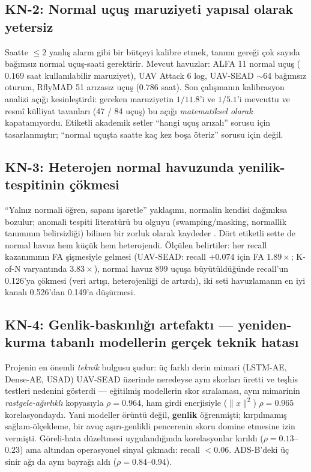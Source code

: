 \documentclass[11pt,a4paper]{article}
\begin{document}
\subsection{KN-2: Normal uçuş maruziyeti yapısal olarak yetersiz}

Saatte $\leq 2$ yanlış alarm gibi bir bütçeyi kalibre etmek, tanımı gereği çok
sayıda bağımsız normal uçuş-saati gerektirir. Mevcut havuzlar: ALFA 11 normal
uçuş ($0.169$ saat kullanılabilir maruziyet), UAV Attack 6 log, UAV-SEAD
$\sim$64 bağımsız oturum, RflyMAD 51 arızasız uçuş ($0.786$ saat). Son
çalışmanın kalibrasyon analizi açığı kesinleştirdi: gereken maruziyetin
$1/11.8$'i ve $1/5.1$'i mevcuttu ve resmî külliyat tavanları (47 / 84 uçuş) bu
açığı \emph{matematiksel olarak} kapatamıyordu. Etiketli akademik setler
``hangi uçuş arızalı'' sorusu için tasarlanmıştır; ``normal uçuşta saatte kaç
kez boşa öteriz'' sorusu için değil.

\subsection{KN-3: Heterojen normal havuzunda yenilik-tespitinin çökmesi}

``Yalnız normali öğren, sapanı işaretle'' yaklaşımı, normalin kendisi
dağınıksa bozulur; anomali tespiti literatürü bu olguyu (swamping/masking,
normallik tanımının belirsizliği) bilinen bir zorluk olarak kaydeder
\cite{ruff2021unifying}. Dört etiketli sette de normal havuz hem küçük hem
heterojendi. Ölçülen belirtiler: her recall kazanımının FA şişmesiyle gelmesi
(UAV-SEAD: recall $+0.074$ için FA $1.89\times$; K-of-N varyantında
$3.83\times$), normal havuz 899 uçuşa büyütüldüğünde recall'un 0.126'ya
çökmesi (veri artışı, heterojenliği de artırdı), iki seti havuzlamanın en iyi
kanalı 0.526'dan 0.149'a düşürmesi.

\subsection{KN-4: Genlik-baskınlığı artefaktı --- yeniden-kurma tabanlı
modellerin gerçek teknik hatası}
\label{sec:kn-artefakt}

Projenin en önemli \emph{teknik} bulgusu şudur: üç farklı derin mimari
(LSTM-AE, Dense-AE, USAD) UAV-SEAD üzerinde neredeyse aynı skorları üretti ve
teşhis testleri nedenini gösterdi --- eğitilmiş modellerin skor sıralaması,
aynı mimarinin \emph{rastgele-ağırlıklı} kopyasıyla $\rho = 0.964$, ham girdi
enerjisiyle ($\lVert x\rVert^2$) $\rho = 0.965$ korelasyondaydı. Yani modeller
örüntü değil, \textbf{genlik} öğrenmişti; kırpılmamış sağlam-ölçekleme, bir
avuç aşırı-genlikli pencerenin skoru domine etmesine izin vermişti. Göreli-hata
düzeltmesi uygulandığında korelasyonlar kırıldı ($\rho = 0.13$--$0.23$) ama
altından operasyonel sinyal çıkmadı: recall $<0.06$. ADS-B'deki üç sinir ağı da
aynı bayrağı aldı ($\rho = 0.84$--$0.94$).
\end{document}
